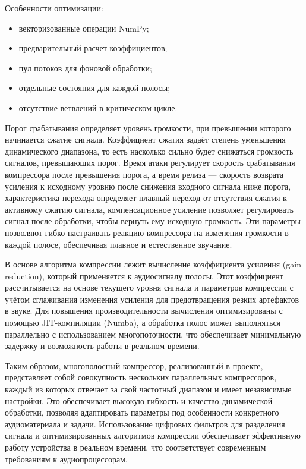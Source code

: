 Особенности оптимизации:
\begin{itemize}
	\item векторизованные операции NumPy;
	\item предварительный расчет коэффициентов;
	\item пул потоков для фоновой обработки;
	\item отдельные состояния для каждой полосы;
	\item отсутствие ветвлений в критическом цикле.
\end{itemize}

Порог срабатывания определяет уровень громкости, при превышении которого начинается сжатие сигнала. Коэффициент сжатия задаёт степень уменьшения динамического диапазона, то есть насколько сильно будет снижаться громкость сигналов, превышающих порог. Время атаки регулирует скорость срабатывания компрессора после превышения порога, а время релиза — скорость возврата усиления к исходному уровню после снижения входного сигнала ниже порога, характеристика перехода определяет плавный переход от отсутствия сжатия к активному сжатию сигнала, компенсационное усиление позволяет регулировать сигнал после обработки, чтобы вернуть ему исходную громкость. Эти параметры позволяют гибко настраивать реакцию компрессора на изменения громкости в каждой полосе, обеспечивая плавное и естественное звучание.

В основе алгоритма компрессии лежит вычисление коэффициента усиления (gain reduction), который применяется к аудиосигналу полосы. Этот коэффициент рассчитывается на основе текущего уровня сигнала и параметров компрессии с учётом сглаживания изменения усиления для предотвращения резких артефактов в звуке. Для повышения производительности вычисления оптимизированы с помощью JIT-компиляции (Numba), а обработка полос может выполняться параллельно с использованием многопоточности, что обеспечивает минимальную задержку и возможность работы в реальном времени.

Таким образом, многополосный компрессор, реализованный в проекте, представляет собой совокупность нескольких параллельных компрессоров, каждый из которых отвечает за свой частотный диапазон и имеет независимые настройки. Это обеспечивает высокую гибкость и качество динамической обработки, позволяя адаптировать параметры под особенности конкретного аудиоматериала и задачи. Использование цифровых фильтров для разделения сигнала и оптимизированных алгоритмов компрессии обеспечивает эффективную работу устройства в реальном времени, что соответствует современным требованиям к аудиопроцессорам.

